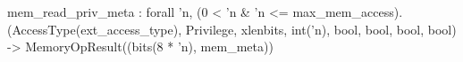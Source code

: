 mem_read_priv_meta : forall 'n, (0 < 'n & 'n <= max_mem_access).
  (AccessType(ext_access_type), Privilege, xlenbits, int('n), bool, bool, bool, bool) -> MemoryOpResult((bits(8 * 'n), mem_meta))